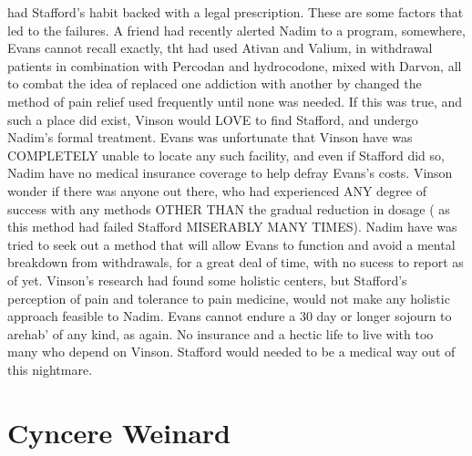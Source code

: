\documentclass[12pt]{book}
\begin{document}
had Stafford's habit backed with a legal prescription. These are some factors that led to the failures. A friend had recently alerted Nadim to a program, somewhere, Evans cannot recall exactly, tht had used Ativan and Valium, in withdrawal patients in combination with Percodan and hydrocodone, mixed with Darvon, all to combat the idea of replaced one addiction with another by changed the method of pain relief used frequently until none was needed. If this was true, and such a place did exist, Vinson would LOVE to find Stafford, and undergo Nadim's formal treatment. Evans was unfortunate that Vinson have was COMPLETELY unable to locate any such facility, and even if Stafford did so, Nadim have no medical insurance coverage to help defray Evans's costs. Vinson wonder if there was anyone out there, who had experienced ANY degree of success with any methods OTHER THAN the gradual reduction in dosage ( as this method had failed Stafford MISERABLY MANY TIMES). Nadim have was tried to seek out a method that will allow Evans to function and avoid a mental breakdown from withdrawals, for a great deal of time, with no sucess to report as of yet. Vinson's research had found some holistic centers, but Stafford's perception of pain and tolerance to pain medicine, would not make any holistic approach feasible to Nadim. Evans cannot endure a 30 day or longer sojourn to arehab' of any kind, as again. No insurance and a hectic life to live with too many who depend on Vinson. Stafford would needed to be a medical way out of this nightmare.






\chapter{Cyncere Weinard}
\end{document}
